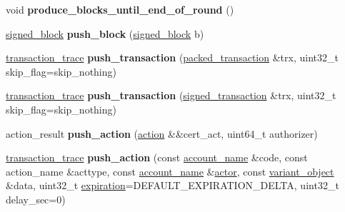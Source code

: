 \begin{DoxyCompactItemize}
void {\bfseries produce\+\_\+blocks\+\_\+until\+\_\+end\+\_\+of\+\_\+round} ()
\item 
\mbox{\label{classaacio_1_1testing_1_1base__tester_a410b7109a8c88c635122122ba9c3408d}} 
\mbox{\hyperlink{structaacio_1_1chain_1_1signed__block}{signed\+\_\+block}} {\bfseries push\+\_\+block} (\mbox{\hyperlink{structaacio_1_1chain_1_1signed__block}{signed\+\_\+block}} b)
\item 
\mbox{\label{classaacio_1_1testing_1_1base__tester_ad06f5cfc121660d35c15658a7adb1c42}} 
\mbox{\hyperlink{structaacio_1_1chain_1_1transaction__trace}{transaction\+\_\+trace}} {\bfseries push\+\_\+transaction} (\mbox{\hyperlink{structaacio_1_1chain_1_1packed__transaction}{packed\+\_\+transaction}} \&trx, uint32\+\_\+t skip\+\_\+flag=skip\+\_\+nothing)
\item 
\mbox{\label{classaacio_1_1testing_1_1base__tester_a2b1296180e014b88a51e12c3921f42bb}} 
\mbox{\hyperlink{structaacio_1_1chain_1_1transaction__trace}{transaction\+\_\+trace}} {\bfseries push\+\_\+transaction} (\mbox{\hyperlink{structaacio_1_1chain_1_1signed__transaction}{signed\+\_\+transaction}} \&trx, uint32\+\_\+t skip\+\_\+flag=skip\+\_\+nothing)
\item 
\mbox{\label{classaacio_1_1testing_1_1base__tester_aceac95957452a86d13b3fa8200f79521}} 
action\+\_\+result {\bfseries push\+\_\+action} (\mbox{\hyperlink{structaacio_1_1chain_1_1action}{action}} \&\&cert\+\_\+act, uint64\+\_\+t authorizer)
\item 
\mbox{\label{classaacio_1_1testing_1_1base__tester_a4d8386b6b1934695d4b09e5d92869065}} 
\mbox{\hyperlink{structaacio_1_1chain_1_1transaction__trace}{transaction\+\_\+trace}} {\bfseries push\+\_\+action} (const \mbox{\hyperlink{structaacio_1_1chain_1_1name}{account\+\_\+name}} \&code, const action\+\_\+name \&acttype, const \mbox{\hyperlink{structaacio_1_1chain_1_1name}{account\+\_\+name}} \&\mbox{\hyperlink{classfc_1_1actor}{actor}}, const \mbox{\hyperlink{classfc_1_1variant__object}{variant\+\_\+object}} \&data, uint32\+\_\+t \mbox{\hyperlink{group__transactioncapi_ga284f37e545cbb7f847f3ab86f50feb1d}{expiration}}=D\+E\+F\+A\+U\+L\+T\+\_\+\+E\+X\+P\+I\+R\+A\+T\+I\+O\+N\+\_\+\+D\+E\+L\+TA, uint32\+\_\+t delay\+\_\+sec=0)

\end{DoxyCompactItemize}
